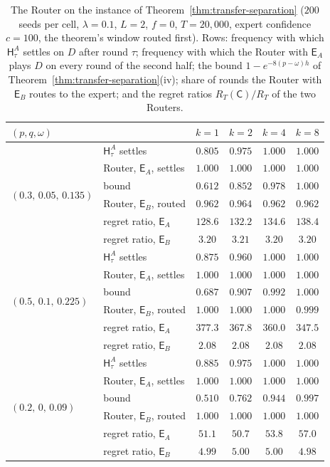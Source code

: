 \documentclass[anon]{alt2027} %
\newcommand{\Cold}{\mathsf{C}}
\newcommand{\Exp}{\mathsf{E}}
\newcommand{\Hyb}{\mathsf{H}}
\begin{document}
\begin{table}[h]
\centering
\caption{The Router on the instance of Theorem~\ref{thm:transfer-separation}
($200$ seeds per cell, $\lambda=0.1$, $L=2$, $f=0$, $T=20{,}000$, expert confidence
$c=100$, the theorem's window routed first). Rows: frequency with which
$\Hyb^A_\tau$ settles on $D$ after round $\tau$; frequency with which the Router
with $\Exp_A$ plays $D$ on every round of the second half; the bound
$1-e^{-8(p-\omega)h}$ of Theorem~\ref{thm:transfer-separation}(iv); share of
rounds the Router with $\Exp_B$ routes to the expert; and the regret ratios
$R_T(\Cold)/R_T$ of the two Routers.}
\label{tab:router-check}
\small
\begin{tabular}{@{}llcccc@{}}
\toprule
$(p,q,\omega)$ & & $k=1$ & $k=2$ & $k=4$ & $k=8$ \\
\midrule
\multirow{6}{*}{$(0.3,\,0.05,\,0.135)$} & $\Hyb^A_\tau$ settles & $0.805$ & $0.975$ & $1.000$ & $1.000$ \\
 & Router, $\Exp_A$, settles & $1.000$ & $1.000$ & $1.000$ & $1.000$ \\
 & bound & $0.612$ & $0.852$ & $0.978$ & $1.000$ \\
 & Router, $\Exp_B$, routed & $0.962$ & $0.964$ & $0.962$ & $0.962$ \\
 & regret ratio, $\Exp_A$ & $128.6$ & $132.2$ & $134.6$ & $138.4$ \\
 & regret ratio, $\Exp_B$ & $3.20$ & $3.21$ & $3.20$ & $3.20$ \\
\midrule
\multirow{6}{*}{$(0.5,\,0.1,\,0.225)$} & $\Hyb^A_\tau$ settles & $0.875$ & $0.960$ & $1.000$ & $1.000$ \\
 & Router, $\Exp_A$, settles & $1.000$ & $1.000$ & $1.000$ & $1.000$ \\
 & bound & $0.687$ & $0.907$ & $0.992$ & $1.000$ \\
 & Router, $\Exp_B$, routed & $1.000$ & $1.000$ & $1.000$ & $0.999$ \\
 & regret ratio, $\Exp_A$ & $377.3$ & $367.8$ & $360.0$ & $347.5$ \\
 & regret ratio, $\Exp_B$ & $2.08$ & $2.08$ & $2.08$ & $2.08$ \\
\midrule
\multirow{6}{*}{$(0.2,\,0,\,0.09)$} & $\Hyb^A_\tau$ settles & $0.885$ & $0.975$ & $1.000$ & $1.000$ \\
 & Router, $\Exp_A$, settles & $1.000$ & $1.000$ & $1.000$ & $1.000$ \\
 & bound & $0.510$ & $0.762$ & $0.944$ & $0.997$ \\
 & Router, $\Exp_B$, routed & $1.000$ & $1.000$ & $1.000$ & $1.000$ \\
 & regret ratio, $\Exp_A$ & $51.1$ & $50.7$ & $53.8$ & $57.0$ \\
 & regret ratio, $\Exp_B$ & $4.99$ & $5.00$ & $5.00$ & $4.98$ \\
\bottomrule
\end{tabular}
\end{table}
\end{document}
